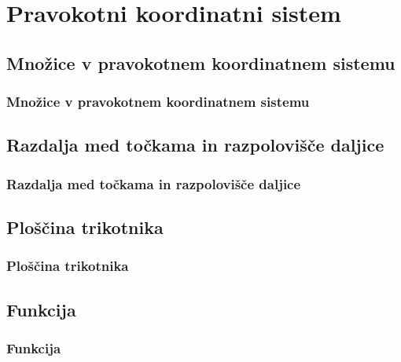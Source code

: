 \section{Pravokotni koordinatni sistem}

\begin{frame}
    \sectionpage
\end{frame}

\begin{frame}
\end{frame}

    \subsection{Množice v pravokotnem koordinatnem sistemu}

        \begin{frame}
            \frametitle{Množice v pravokotnem koordinatnem sistemu}
        \end{frame}

    \subsection{Razdalja med točkama in razpolovišče daljice}

        \begin{frame}
            \frametitle{Razdalja med točkama in razpolovišče daljice}
        \end{frame}

    \subsection{Ploščina trikotnika}

        \begin{frame}
            \frametitle{Ploščina trikotnika}
        \end{frame}

    \subsection{Funkcija}

        \begin{frame}
            \frametitle{Funkcija}
        \end{frame}


